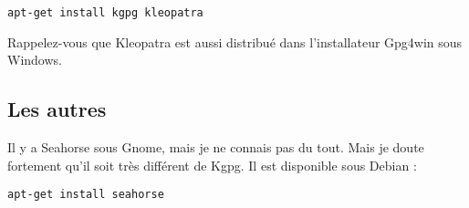 \begin{lstlisting}
apt-get install kgpg kleopatra
\end{lstlisting}

Rappelez-vous que Kleopatra est aussi distribué dans l'installateur
Gpg4win sous Windows.

\subsection{Les autres}\label{les-autres-1}

Il y a Seahorse sous Gnome, mais je ne connais pas du tout. Mais je
doute fortement qu'il soit très différent de Kgpg. Il est disponible
sous Debian :

\begin{lstlisting}
apt-get install seahorse
\end{lstlisting}
